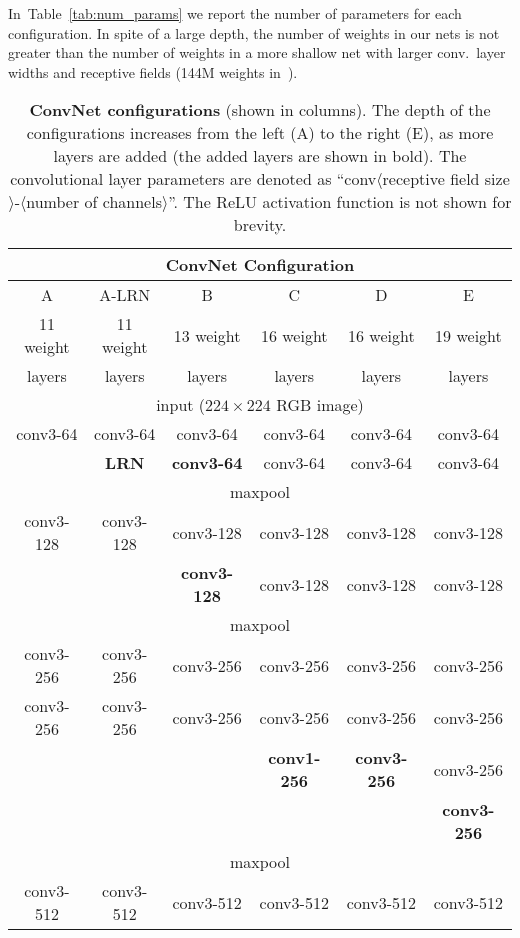 \documentclass{article} %
\newcommand{\tblref}[1]{Table~\ref{#1}}
\begin{document}
In~\tblref{tab:num_params} we report the number of parameters for each configuration.
In spite of a large depth, the number of weights in our nets is not greater than the number of weights in a more shallow net with larger conv.\ layer widths and receptive fields
(144M weights in~\citep{Sermanet14}).

\begin{table}[htb]
\centering
\small
\caption{\textbf{ConvNet configurations} (shown in columns).
The depth of the configurations increases from the left (A) to the right (E), as more layers are added (the added layers are shown in bold).
The convolutional layer parameters are denoted as ``conv$\langle$receptive field size$\rangle$-$\langle$number of channels$\rangle$''.
The ReLU activation function is not shown for brevity.
}
\begin{tabular}{|c|c|c|c|c|c|} \hline
\multicolumn{6}{|c|}{{ConvNet Configuration}} \\ \hline
A & A-LRN & B & C & D & E \\ \hline
11 weight & 11 weight & 13 weight & 16 weight & 16 weight & 19 weight \\ 
layers & layers & layers & layers & layers & layers \\ \hline\hline
\multicolumn{6}{|c|}{input ($224 \times 224$ RGB image)} \\ \hline
conv3-64 & conv3-64 & conv3-64 & conv3-64 & conv3-64 & conv3-64 \\ 
 & \textbf{LRN} & \textbf{conv3-64} & conv3-64 & conv3-64 & conv3-64\\ \hline
\multicolumn{6}{|c|}{maxpool} \\ \hline
conv3-128 & conv3-128 & conv3-128 & conv3-128 & conv3-128 & conv3-128 \\ 
 & & \textbf{conv3-128} & conv3-128 & conv3-128 & conv3-128 \\ \hline
\multicolumn{6}{|c|}{maxpool} \\ \hline
conv3-256 & conv3-256 & conv3-256 & conv3-256 & conv3-256 & conv3-256 \\ 
conv3-256 & conv3-256 & conv3-256 & conv3-256 & conv3-256 & conv3-256 \\ 
& & & \textbf{conv1-256} & \textbf{conv3-256} & conv3-256 \\ 
& & & & & \textbf{conv3-256} \\ \hline
\multicolumn{6}{|c|}{maxpool} \\ \hline
conv3-512 & conv3-512 & conv3-512 & conv3-512 & conv3-512 & conv3-512 \\ 

\end{tabular}
\end{table}
\end{document}
